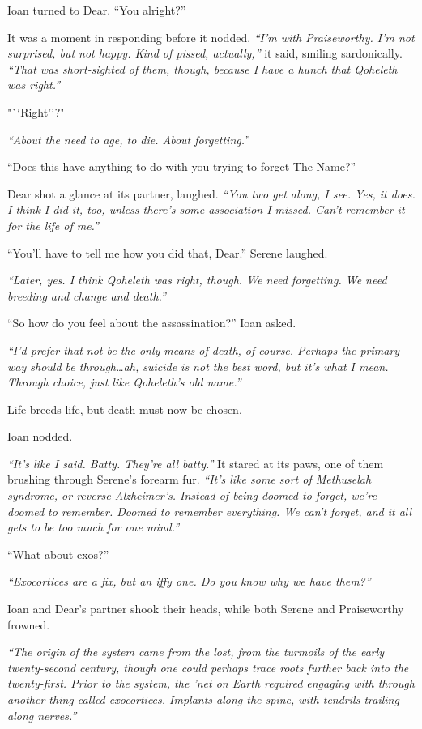 Ioan turned to Dear. ``You alright?''

It was a moment in responding before it nodded. \emph{``I'm with Praiseworthy. I'm not surprised, but not happy. Kind of pissed, actually,''} it said, smiling sardonically. \emph{``That was short-sighted of them, though, because I have a hunch that Qoheleth was right.''}

"``Right''?"

\emph{``About the need to age, to die. About forgetting.''}

``Does this have anything to do with you trying to forget The Name?''

Dear shot a glance at its partner, laughed. \emph{``You two get along, I see. Yes, it does. I think I did it, too, unless there's some association I missed. Can't remember it for the life of me.''}

``You'll have to tell me how you did that, Dear.'' Serene laughed.

\emph{``Later, yes. I think Qoheleth was right, though. We need forgetting. We need breeding and change and death.''}

``So how do you feel about the assassination?'' Ioan asked.

\emph{``I'd prefer that not be the only means of death, of course. Perhaps the primary way should be through\ldots{}ah, suicide is not the best word, but it's what I mean. Through choice, just like Qoheleth's old name.''}

Life breeds life, but death must now be chosen.

Ioan nodded.

\emph{``It's like I said. Batty. They're all batty.''} It stared at its paws, one of them brushing through Serene's forearm fur. \emph{``It's like some sort of Methuselah syndrome, or reverse Alzheimer's. Instead of being doomed to forget, we're doomed to remember. Doomed to remember everything. We can't forget, and it all gets to be too much for one mind.''}

``What about exos?''

\emph{``Exocortices are a fix, but an iffy one. Do you know why we have them?''}

Ioan and Dear's partner shook their heads, while both Serene and Praiseworthy frowned.

\emph{``The origin of the system came from the lost, from the turmoils of the early twenty-second century, though one could perhaps trace roots further back into the twenty-first. Prior to the system, the 'net on Earth required engaging with through another thing called exocortices. Implants along the spine, with tendrils trailing along nerves.''}

